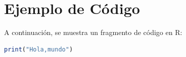 \documentclass{article}
\begin{document}
\section*{Ejemplo de Código}

A continuación, se muestra un fragmento de código en R:

\begin{lstlisting}[style=colored, language=R]
print("Hola,mundo")
\end{lstlisting}
\end{document}
